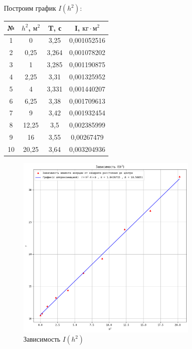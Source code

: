 \documentclass[a4paper]{article}
\begin{document}
Построим график $I(h^2)$:

\begin{table}[h!]
\begin{center}
\begin{tabular}{|c|c|c|c|}
\hline
№  & $h^2$, $\text{м}^2$ & T, с  & I, $\text{кг}\cdot\text{м}^2$ \\ \hline
1  & 0      & 3,25  & 0,001052516 \\ \hline
2  & 0,25   & 3,264 & 0,001078202 \\ \hline
3  & 1      & 3,285 & 0,001190875 \\ \hline
4  & 2,25   & 3,31  & 0,001325952 \\ \hline
5  & 4      & 3,331 & 0,001440207 \\ \hline
6  & 6,25   & 3,38  & 0,001709613 \\ \hline
7  & 9      & 3,42  & 0,001932454 \\ \hline
8  & 12,25  & 3,5   & 0,002385999 \\ \hline
9  & 16     & 3,55  & 0,00267479  \\ \hline
10 & 20,25  & 3,64  & 0,003204936 \\ \hline
\end{tabular}
\end{center}
\end{table}

\begin{figure}[t]
    \centering
    \includegraphics[width=0.8\textwidth]{graphic}
    \caption{Зависимость $I(h^2)$}
\end{figure}
\end{document}
